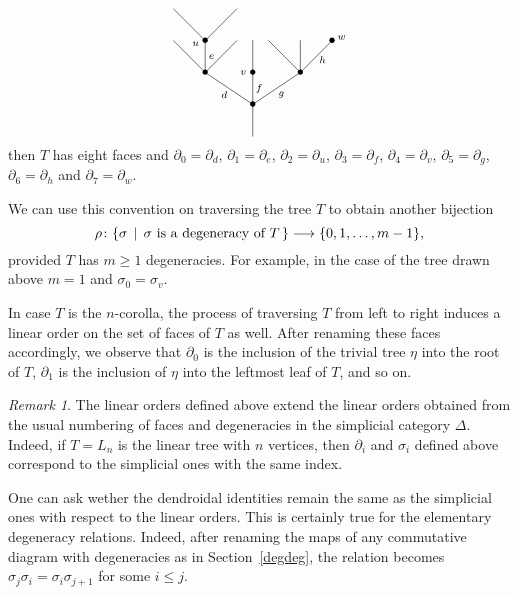 \documentclass[a4paper]{amsart}
\theoremstyle{plain}
\theoremstyle{definition}
\theoremstyle{remark}
\newtheorem{rem}[thm]{Remark}
\newcommand{\To}{\longrightarrow}
\numberwithin{equation}{section}
\numberwithin{figure}{section}
\begin{document}
\begin{equation}\label{eq:tree1}
    \xy<0.08cm,0cm>:
    (25,-20)*=0{}="1";
    (25,-10)*=0{\bullet}="2";
    (10,0)*=0{\bullet}="3";
    (25,0)*=0{\bullet}="4";
    (40,0)*=0{\bullet}="5";
    (0,10)*=0{}="6";
    (10,10)*=0{\bullet}="7";
    (20,10)*=0{}="8";
    (25,10)*=0{}="9";
    (30,10)*=0{}="10";
    (40,10)*=0{}="11";
    (50,10)*=0{\bullet}="12";
    (0,20)*=0{}="13";
    (20,20)*=0{}="14";
    (7,9)*{\scriptstyle u};
    (22,0)*{\scriptstyle v};
    (53,11)*{\scriptstyle w};
    (16,-7)*{\scriptstyle d};
    (12,5)*{\scriptstyle e};
    (27,-5)*{\scriptstyle f};
    (34,-7)*{\scriptstyle g};
    (47,4)*{\scriptstyle h};
    "1";"2" **\dir{-};
    "2";"3" **\dir{-};
    "2";"4" **\dir{-};
    "2";"5" **\dir{-};
    "3";"6" **\dir{-};
    "3";"7" **\dir{-};
    "3";"8" **\dir{-};
    "4";"9" **\dir{-};
    "5";"10" **\dir{-};
    "5";"11" **\dir{-};
    "5";"12" **\dir{-};
    "7";"13" **\dir{-};
    "7";"14" **\dir{-};
    \endxy
\end{equation}
then $T$ has eight faces and $\partial_0=\partial_d$, $\partial_1=\partial_e$, $\partial_2=\partial_u$, $\partial_3=\partial_f$, $\partial_4=\partial_v$, $\partial_5=\partial_g$, $\partial_6=\partial_h$ and $\partial_7=\partial_w$.

We can use this convention on traversing the tree $T$ to obtain another bijection
$$
    \rho\colon\{\sigma\,\mid\, \sigma \textnormal{ is a degeneracy of $T$}\, \}\To\{0,1,\ldots, m-1\},
$$
provided $T$ has $m\ge 1$ degeneracies. For example, in the case of the tree drawn above $m=1$ and $\sigma_0=\sigma_v$.

In case $T$ is the $n$-corolla, the process of traversing $T$ from left to right induces a linear order on the set of faces of $T$ as well. After renaming these faces accordingly, we observe that  $\partial_0$ is the inclusion of the trivial tree $\eta$ into the root of $T$, $\partial_1$ is the inclusion of $\eta$ into the leftmost leaf of $T$, and so on.

\begin{rem}
    The linear orders defined above extend the linear orders obtained from the usual numbering of faces and degeneracies in the simplicial category
    $\Delta$. Indeed, if $T=L_n$ is the linear tree with $n$ vertices, then $\partial_i$ and $\sigma_i$ defined above correspond to the simplicial ones with the same index.
\end{rem}

One can ask wether the dendroidal identities remain the same as the simplicial ones with respect to the linear orders. This is certainly true for the elementary degeneracy relations. Indeed, after renaming the maps of any commutative diagram with degeneracies as in Section~\ref{degdeg}, the relation becomes $\sigma_j\sigma_i=\sigma_i\sigma_{j+1}$ for some $i\le j$.
\end{document}
